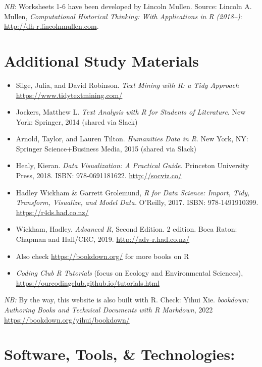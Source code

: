 \documentclass[
]{book}
\providecommand{\tightlist}{%
  \setlength{\itemsep}{0pt}\setlength{\parskip}{0pt}}
\begin{document}
\emph{NB}: Worksheets 1-6 have been developed by Lincoln Mullen. Source: Lincoln A. Mullen, \emph{Computational Historical Thinking: With Applications in R (2018--)}: \url{http://dh-r.lincolnmullen.com}.

\hypertarget{additional-study-materials}{%
\section{Additional Study Materials}\label{additional-study-materials}}

\begin{itemize}
\tightlist
\item
  Silge, Julia, and David Robinson. \emph{Text Mining with R: a Tidy Approach} \url{https://www.tidytextmining.com/}
\item
  Jockers, Matthew L. \emph{Text Analysis with R for Students of Literature}. New York: Springer, 2014 (shared via Slack)
\item
  Arnold, Taylor, and Lauren Tilton. \emph{Humanities Data in R}. New York, NY: Springer Science+Business Media, 2015 (shared via Slack)
\item
  Healy, Kieran. \emph{Data Visualization: A Practical Guide.} Princeton University Press, 2018. ISBN: 978-0691181622. \url{http://socviz.co/}
\item
  Hadley Wickham \& Garrett Grolemund, \emph{R for Data Science: Import, Tidy, Transform, Visualize, and Model Data.} O'Reilly, 2017. ISBN: 978-1491910399. \url{https://r4ds.had.co.nz/}
\item
  Wickham, Hadley. \emph{Advanced R}, Second Edition. 2 edition. Boca Raton: Chapman and Hall/CRC, 2019. \url{http://adv-r.had.co.nz/}
\item
  Also check \url{https://bookdown.org/} for more books on R
\item
  \emph{Coding Club R Tutorials} (focus on Ecology and Environmental Sciences), \url{https://ourcodingclub.github.io/tutorials.html}
\end{itemize}

\emph{NB:} By the way, this website is also built with R. Check: Yihui Xie. \emph{bookdown: Authoring Books and Technical Documents with R Markdown}, 2022 \url{https://bookdown.org/yihui/bookdown/}

\hypertarget{software-tools-technologies}{%
\section{Software, Tools, \& Technologies:}\label{software-tools-technologies}}
\end{document}
